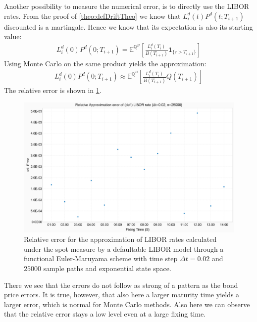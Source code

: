 \documentclass[12pt]{article}
\begin{document}
	Another possibility to measure the numerical error, is to directly use the LIBOR rates. From the proof of \cref{theo:defDriftTheo} we know that $L^d_i(t)P^d(t;T_{i+1})$ discounted is a martingale. Hence we know that its expectation is also its starting value:
	\begin{align*}
		L^d_i(0)P^d(0;T_{i+1}) = \mathbb{E}^{\mathbb{Q}^B}\left[\frac{L^d_i\left(T_{i}\right)}{B(T_{i+1})}\mathbf{1}_{\{\tau > T_{i+1}\}}\right]
	\end{align*}
	Using Monte Carlo on the same product yields the approximation:
	\begin{align*}
		L^d_i(0)P^d(0;T_{i+1}) \approx \mathbb{E}^{\mathbb{Q}^B}\left[\frac{L^d_i\left(T_{i}\right)}{B(T_{i+1})}Q\left(T_{i+1}\right)\right]
	\end{align*}
	The relative error is shown in \cref{fig:liborerrorrel}.
	\begin{figure}[h!]
		\centering
		\includegraphics[width=0.7\linewidth]{figures/Today/LIBORError_rel}
		\caption{Relative error for the approximation of LIBOR rates calculated under the spot measure by a defaultable LIBOR model through a functional Euler-Maruyama scheme with time step $\Delta t=0.02$ and $25000$ sample paths and exponential state space.}
		\label{fig:liborerrorrel}
	\end{figure}
	There we see that the errors do not follow as strong of a pattern as the bond price errors. It is true, however, that also here a larger maturity time yields a larger error, which is normal for Monte Carlo methods. Also here we can observe that the relative error stays a low level even at a large fixing time.
	
	
\end{document}
